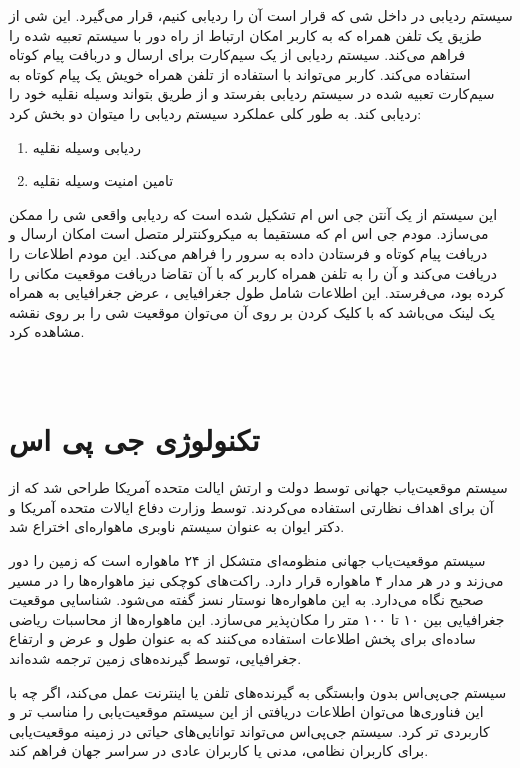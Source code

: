  
  سیستم ردیابی در داخل شی که قرار است آن را ردیابی کنیم، قرار می‌گیرد. این شی از طزیق یک تلفن همراه که به کاربر امکان ارتباط از راه دور با سیستم تعبیه شده را فراهم می‌کند. سیستم ردیابی از یک سیم‌کارت برای ارسال و دربافت پیام کوتاه استفاده می‌کند. کاربر می‌تواند با استفاده از تلفن همراه خویش یک پیام کوتاه به سیم‌کارت تعبیه شده در سیستم ردیابی بفرستد و از طریق بتواند وسیله نقلیه خود را ردیابی کند.
به طور کلی عملکرد سیستم ردیابی را میتوان دو بخش کرد:
  \begin{enumerate}
  	\item ردیابی وسیله نقلیه
	\item تامین امنیت وسیله نقلیه
  \end{enumerate}
این سیستم از یک آنتن جی اس ام تشکیل شده است که ردیابی واقعی شی را ممکن می‌سازد. مودم جی اس ام که مستقیما به میکروکنترلر متصل است امکان ارسال و دریافت پیام کوتاه و فرستادن داده به سرور را فراهم می‌کند. این مودم اطلاعات را دریافت می‌کند و آن را به تلفن همراه کاربر که با آن تقاضا دریافت موقعیت مکانی را کرده بود، می‌فرستد. این اطلاعات شامل طول جغرافیایی ، عرض جغرافیایی  به همراه یک لینک می‌باشد که با کلیک کردن بر روی آن می‌توان موقعیت شی را بر روی نقشه مشاهده کرد.
\\
\\
\\
\section{تکنولوژی جی پی اس}
سیستم موقعیت‌‌یاب جهانی توسط دولت و ارتش ایالت متحده آمریکا طراحی شد که از آن برای اهداف نظارتی استفاده می‌کردند.  توسط وزارت دفاع ایالات متحده آمریکا و دکتر ایوان  به عنوان سیستم ناوبری ماهواره‌‌ای اختراع شد.


سیستم موقعیت‌یاب جهانی منظومه‌ای متشکل از ۲۴ ماهواره است که زمین را دور می‌زند و در هر مدار ۴ ماهواره قرار دارد. راکت‌های کوچکی نیز ماهواره‌ها را در مسیر صحیح نگاه می‌دارد. به این ماهواره‌ها نوستار نسز گفته می‌شود.
شناسایی موقعیت جغرافیایی بین ۱۰ تا ۱۰۰ متر را مکان‌پذیر می‌سازد. این ماهواره‌ها از محاسبات ریاضی ساده‌ای برای پخش اطلاعات استفاده می‌کنند که به عنوان طول و عرض و ارتفاع جغرافیایی، توسط گیرنده‌های زمین ترجمه شده‌اند.


سیستم جی‌پی‌اس بدون وابستگی به گیرنده‌های تلفن یا اینترنت عمل می‌کند، اگر چه با این فناوری‌ها می‌توان اطلاعات دریافتی از این سیستم موقعیت‌یابی را مناسب تر و کاربردی تر کرد. سیستم جی‌پی‌اس می‌تواند توانایی‌های حیاتی در زمینه موقعیت‌یابی برای کاربران نظامی، مدنی یا کاربران عادی در سراسر جهان فراهم کند. 



